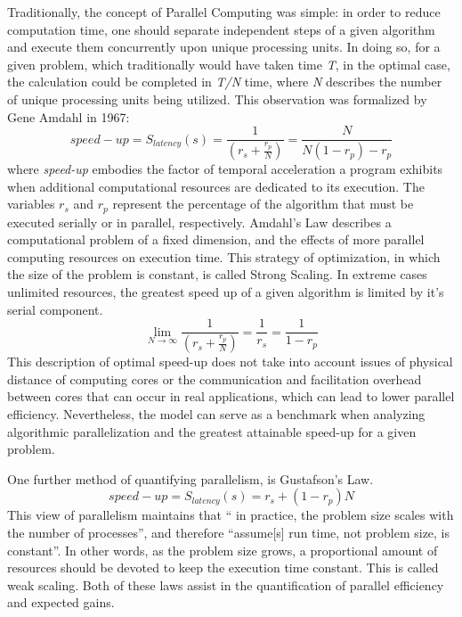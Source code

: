Traditionally, the concept of Parallel Computing was simple: in order to
reduce computation time, one should separate independent steps of a given algorithm
and execute them concurrently upon unique processing units.  In doing so, for a given
problem, which traditionally would have taken time \textit{T}, in the optimal case,
the calculation could be completed in \textit{T/N} time, where \textit{N} describes
the number of unique processing units being utilized.  This observation was formalized
by Gene Amdahl in 1967\cite{Wilt}:
%
\begin{equation}
  \tag{Amdahl's Law}
  speed-up = S_{latency}(s)= \frac{1}{(r_{s} + \frac{r_{p}}{N})} = \frac{N}{N(1-r_{p})-r_{p}}
  \label{egn:Amdahl}
\end{equation}
%
where \textit{\gls{speed-up}} embodies the factor of temporal acceleration a program
exhibits when additional computational resources are dedicated to its execution.
The variables \textit{$r_{s}$} and \textit{$ r_{p} $} represent the percentage of
 the algorithm that must be executed serially or in parallel, respectively.
   Amdahl's Law describes a computational problem of a fixed dimension,
and the effects of more parallel computing resources on execution time.
This strategy of optimization, in which the size of the problem is constant,
 is called Strong Scaling.
In extreme cases unlimited resources, the greatest speed up of a given algorithm
 is limited by it's serial component.
%
\begin{equation}
 \lim_{N\to\infty}  \frac{1}{(r_{s} + \frac{r_{p}}{N})} = \frac{1}{r_{s}} = \frac{1}{1-r_{p}}
\end{equation}
%
This description of optimal \gls{speed-up} does not take into account issues of physical
distance of computing cores or the communication and facilitation overhead between
cores that can occur in real applications, which can lead to lower parallel efficiency.
Nevertheless, the model can serve as a benchmark when analyzing algorithmic
parallelization and  the greatest attainable speed-up for a given problem.\par

One further method of quantifying parallelism, is Gustafson's Law\cite{Gustafson}.
%
\begin{equation}
  \tag{Gustofson's Law}
  speed-up = S_{latency}(s) = r_{s} + (1 - r_{p})N
\end{equation}
%
This view of parallelism maintains that `` in practice, the problem
size scales with the number of processes'', and therefore
``assume[s] run time, not problem size, is constant''.
In other words, as the problem size grows, a proportional
amount of resources should be devoted to keep the execution time constant.  This
is called weak scaling.
Both of these laws assist in the quantification of parallel efficiency and
expected gains.

